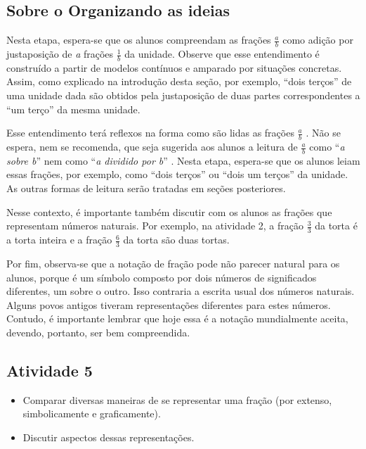 \documentclass[oneside]{book}
\begin{document}
\begin{multicols}{2}
\section*{Sobre o Organizando as ideias}



  Nesta etapa, espera-se que os alunos compreendam as frações   $\frac{a}{b}$   como adição por justaposição de   {\it a}   frações   $\frac{1}{b}$   da unidade. Observe que esse entendimento é construído a partir de modelos contínuos e amparado por situações concretas. Assim, como explicado na introdução desta seção, por exemplo,   ``dois terços''   de uma unidade dada são obtidos pela justaposição de duas partes correspondentes a   ``um terço''   da mesma unidade.

  Esse entendimento terá reflexos na forma como são lidas as frações   $\frac{a}{b}$  . Não se espera, nem se recomenda, que seja sugerida aos alunos a leitura de   $\frac{a}{b}$   como   ``{\it a sobre b}''   nem como   ``{\it a dividido por b}''  . Nesta etapa, espera-se que os alunos leiam essas frações, por exemplo, como   ``dois terços''   ou   ``dois um terços''   da unidade. As outras formas de leitura serão tratadas em seções posteriores.

  Nesse contexto, é importante também discutir com os alunos as frações que representam números naturais. Por exemplo, na atividade 2, a fração   $\frac{3}{3}$   da torta é a torta inteira e a fração   $\frac{6}{3}$   da torta são duas tortas.

  Por fim, observa-se que a notação de fração pode não parecer natural para os alunos, porque é um símbolo composto por dois números de significados diferentes, um sobre o outro. Isso contraria a escrita usual dos números naturais. Alguns povos antigos tiveram representações diferentes para estes números.  Contudo, é importante lembrar que hoje essa é a notação mundialmente aceita, devendo, portanto, ser bem compreendida.



\subsection{Atividade 5}

   \vspace{.1cm}

  \begin{itemize} %
    \item       Comparar diversas maneiras de se representar uma fração (por extenso, simbolicamente e graficamente).
    \item       Discutir aspectos dessas representações.
\end{itemize} %



\end{multicols}
\end{document}
